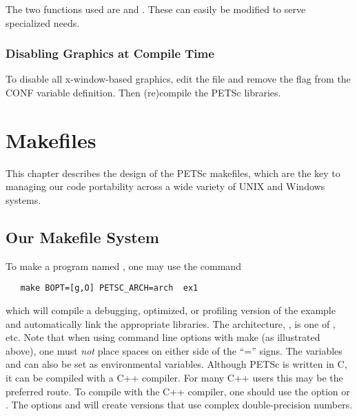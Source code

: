 The two functions used are  
and   . These 
can easily be modified to serve specialized needs.


\subsection{Disabling Graphics at Compile Time}

To disable all x-window-based graphics, edit the file
 and remove the flag
 from the CONF variable definition.  Then (re)compile
the PETSc libraries.


\chapter{Makefiles}
\label{ch:makefiles}

This chapter describes the design of the PETSc makefiles, which are the
key to managing our code portability across a wide variety of UNIX and Windows systems.

\section{Our Makefile System}

To make a program named , one may use the command
\begin{verbatim}
   make BOPT=[g,O] PETSC_ARCH=arch  ex1
\end{verbatim}
which will compile a debugging, optimized, or profiling version
of the example and automatically link the appropriate libraries.  The
architecture, , is one of , etc. Note
that when using command line options with make (as illustrated above),
one must {\em not} place spaces on either side of the ``='' signs.
The variables  and 
 can also be set as environmental
variables.  Although PETSc is written in C, it can be compiled with a 
C++ compiler.  For many C++ users this may be the preferred route. To compile
with the C++ compiler, one should use the option  or 
.  
The options  and 
will create versions that use complex double-precision numbers. 

